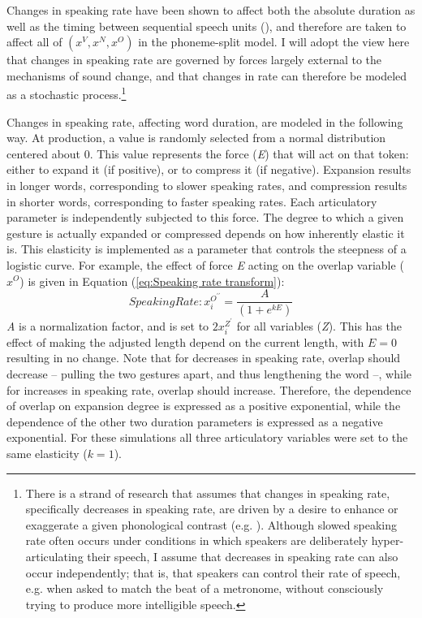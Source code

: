 Changes in speaking rate have been shown to affect both the absolute
duration as well as the timing between sequential speech units (\citealt{stetson1928motor,Hardcastle1985}),
and therefore are taken to affect all of $(x^{V},x^{N},x^{O})$ in
the phoneme-split model. I will adopt the view here that changes in
speaking rate are governed by forces largely external to the mechanisms
of sound change, and that changes in rate can therefore be modeled
as a stochastic process.\footnote{There is a strand of research that assumes that changes in speaking
rate, specifically decreases in speaking rate, are driven by a desire
to enhance or exaggerate a given phonological contrast (e.g. \citealt{beckman2011rate}).
Although slowed speaking rate often occurs under conditions in which
speakers are deliberately hyper-articulating their speech, I assume
that decreases in speaking rate can also occur independently; that
is, that speakers can control their rate of speech, e.g. when asked
to match the beat of a metronome, without consciously trying to produce
more intelligible speech.}

Changes in speaking rate, affecting word duration, are modeled in
the following way. At production, a value is randomly selected from
a normal distribution centered about 0. This value represents the
force (\emph{E}) that will act on that token: either to expand it
(if positive), or to compress it (if negative). Expansion results
in longer words, corresponding to slower speaking rates, and compression
results in shorter words, corresponding to faster speaking rates.
Each articulatory parameter is independently subjected to this force.
The degree to which a given gesture is actually expanded or compressed
depends on how inherently elastic it is. This elasticity is implemented
as a parameter that controls the steepness of a logistic curve. For
example, the effect of force \emph{E} acting on the overlap variable
($x^{O}$) is given in Equation (\ref{eq:Speaking rate transform}): 
\begin{equation}
\textit{SpeakingRate}:x_{i}^{O^{\prime\prime}}=\frac{A}{(1+e^{kE})}\label{eq:Speaking rate transform}
\end{equation}
\emph{A} is a normalization factor, and is set to $2x_{i}^{Z^{\prime}}$
for all variables (\emph{Z}). This has the effect of making the adjusted
length depend on the current length, with $E=0$ resulting in no change.
Note that for decreases in speaking rate, overlap should decrease
– pulling the two gestures apart, and thus lengthening the word –, while for increases in speaking rate, overlap should increase. Therefore,
the dependence of overlap on expansion degree is expressed as a positive
exponential, while the dependence of the other two duration parameters
is expressed as a negative exponential. For these simulations all
three articulatory variables were set to the same elasticity ($k=1$). 

